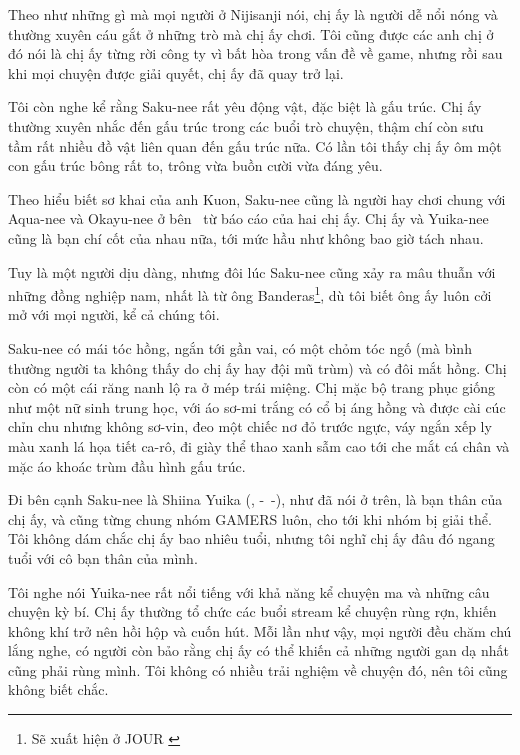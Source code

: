 \documentclass[../main.tex]{subfiles}
\begin{document}
Theo như những gì mà mọi người ở Nijisanji nói, chị ấy là người dễ nổi nóng và thường xuyên cáu gắt ở những trò mà chị ấy chơi. Tôi cũng được các anh chị ở đó nói là chị ấy từng rời công ty vì bất hòa trong vấn đề về game, nhưng rồi sau khi mọi chuyện được giải quyết, chị ấy đã quay trở lại.

Tôi còn nghe kể rằng Saku-nee rất yêu động vật, đặc biệt là gấu trúc. Chị ấy thường xuyên nhắc đến gấu trúc trong các buổi trò chuyện, thậm chí còn sưu tầm rất nhiều đồ vật liên quan đến gấu trúc nữa. Có lần tôi thấy chị ấy ôm một con gấu trúc bông rất to, trông vừa buồn cười vừa đáng yêu.

Theo hiểu biết sơ khai của anh Kuon, Saku-nee cũng là người hay chơi chung với Aqua-nee và Okayu-nee ở bên \hll\ từ báo cáo của hai chị ấy. Chị ấy và Yuika-nee cũng là bạn chí cốt của nhau nữa, tới mức hầu như không bao giờ tách nhau.

Tuy là một người dịu dàng, nhưng đôi lúc Saku-nee cũng xảy ra mâu thuẫn với những đồng nghiệp nam, nhất là từ ông Banderas\footnote{Sẽ xuất hiện ở {\flaregothic JOUR }}, dù tôi biết ông ấy luôn cởi mở với mọi người, kể cả chúng tôi.

Saku-nee có mái tóc hồng, ngắn tới gần vai, có một chỏm tóc ngố (mà bình thường người ta không thấy do chị ấy hay đội mũ trùm) và có đôi mắt hồng. Chị còn có một cái răng nanh lộ ra ở mép trái miệng. Chị mặc bộ trang phục giống như một nữ sinh trung học, với áo sơ-mi trắng có cổ bị áng hồng và được cài cúc chỉn chu nhưng không sơ-vin, đeo một chiếc nơ đỏ trước ngực, váy ngắn xếp ly màu xanh lá họa tiết ca-rô, đi giày thể thao xanh sẫm cao tới che mắt cá chân và mặc áo khoác trùm đầu hình gấu trúc.


Đi bên cạnh Saku-nee là Shiina Yuika (, -\ -), như đã nói ở trên, là bạn thân của chị ấy, và cũng từng chung nhóm GAMERS luôn, cho tới khi nhóm bị giải thể. Tôi không dám chắc chị ấy bao nhiêu tuổi, nhưng tôi nghĩ chị ấy đâu đó ngang tuổi với cô bạn thân của mình.

Tôi nghe nói Yuika-nee rất nổi tiếng với khả năng kể chuyện ma và những câu chuyện kỳ bí. Chị ấy thường tổ chức các buổi stream kể chuyện rùng rợn, khiến không khí trở nên hồi hộp và cuốn hút. Mỗi lần như vậy, mọi người đều chăm chú lắng nghe, có người còn bảo rằng chị ấy có thể khiến cả những người gan dạ nhất cũng phải rùng mình. Tôi không có nhiều trải nghiệm về chuyện đó, nên tôi cũng không biết chắc.
\end{document}
